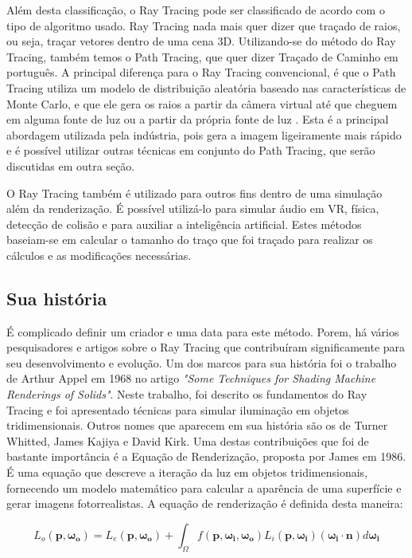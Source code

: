 \documentclass[journal]{IEEEtran}
\begin{document}
Além desta classificação, o Ray Tracing pode ser classificado de acordo com o tipo
de algoritmo usado. Ray Tracing nada mais quer dizer que traçado de raios, ou seja,
traçar vetores dentro de uma cena 3D. Utilizando-se do método do Ray Tracing, também
temos o Path Tracing, que quer dizer Traçado de Caminho em português. A principal
diferença para o Ray Tracing convencional, é que o Path Tracing utiliza um modelo
de distribuição aleatória baseado nas características de Monte Carlo, e que ele gera
os raios a partir da câmera virtual até que cheguem em alguma fonte de luz ou a partir 
da própria fonte de luz . Esta é a 
principal abordagem utilizada pela indústria, pois gera a imagem ligeiramente
mais rápido e é possível utilizar outras técnicas em conjunto do Path Tracing,
que serão discutidas em outra seção.
\cite{c4}

O Ray Tracing também é utilizado para outros fins dentro de uma simulação além
da renderização. É possível utilizá-lo para simular áudio em VR, física, detecção
de colisão e para auxiliar a inteligência artificial. Estes métodos baseiam-se em
calcular o tamanho do traço que foi traçado para realizar os cálculos e as modificações
necessárias.
\cite{c10}

\subsection{Sua história}
É complicado definir um criador e uma data para este método. Porem, há vários
pesquisadores e artigos sobre o Ray Tracing que contribuíram significamente para
seu desenvolvimento e evolução. Um dos marcos para sua história foi o trabalho
de Arthur Appel em 1968 no artigo \emph{"Some Techniques for Shading Machine
Renderings of Solids"}. Neste trabalho, foi descrito os fundamentos do Ray Tracing
e foi apresentado técnicas para simular iluminação em objetos tridimensionais.
Outros nomes que aparecem em sua história são os de Turner Whitted, James Kajiya
e David Kirk. Uma destas contribuições que foi de bastante importância é a
Equação de Renderização, proposta por James em 1986. É uma equação que descreve
a iteração da luz em objetos tridimensionais, fornecendo um modelo matemático
para calcular a aparência de uma superfície e gerar imagens fotorrealistas.
A equação de renderização é definida desta maneira:

\[
L_o(\mathbf{p}, \mathbf{\omega_o}) = L_e(\mathbf{p}, \mathbf{\omega_o}) + \int_{\Omega} f(\mathbf{p}, \mathbf{\omega_i}, \mathbf{\omega_o}) L_i(\mathbf{p}, \mathbf{\omega_i}) (\mathbf{\omega_i} \cdot \mathbf{n}) d\mathbf{\omega_i}
\]
\end{document}
